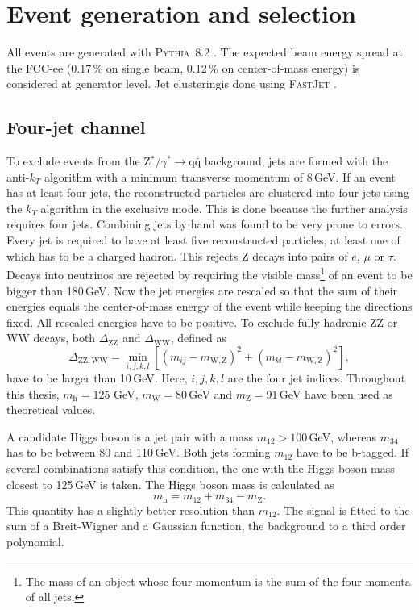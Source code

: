 \section{Event generation and selection}
All events are generated with \textsc{Pythia~8.2} \cite{pythia82}. The expected beam energy spread at the FCC-ee (0.17\,\% on single beam, 0.12\,\% on center-of-mass energy) is considered at generator level. Jet clusteringis done using \textsc{FastJet} \cite{fastjet}.

\subsection{Four-jet channel}
To exclude events from the Z$^*/\gamma^* \rightarrow \mathrm{q\bar{q}}$ background, jets are formed with the anti-$k_T$ algorithm \cite{antikt_algo} with a minimum transverse momentum of 8\,GeV. If an event has at least four jets, the reconstructed particles are clustered into four jets using the $k_T$ algorithm \cite{kt_algo} in the exclusive mode. This is done because the further analysis requires four jets. Combining jets by hand was found  to be very prone to errors.
Every jet is required to have at least five reconstructed particles,  at least one of which has to be a charged hadron. This rejects Z decays into pairs of $e$, $\mu$ or $\tau$. Decays into neutrinos are rejected by requiring the visible mass\footnote{The mass of an object whose four-momentum is the sum of the four momenta of all jets.} of an event to be bigger than 180\,GeV. Now the jet energies are rescaled so that the sum of their energies equals the center-of-mass energy of the event while keeping the directions fixed. 
All rescaled energies have to be positive.
To exclude fully hadronic ZZ or WW decays, both $\Delta_\mathrm{ZZ}$ and $\Delta_\mathrm{WW}$, defined as
\begin{equation}
\Delta_\mathrm{ZZ, WW} = \min_{i, j, k, l} [(m_{ij} - m_\mathrm{W, Z})^2 + (m_{kl} - m_\mathrm{W, Z})^2],
\end{equation}
have to be larger than 10\,GeV. Here, $i, j, k, l$ are the four jet indices. Throughout this thesis, $m_\mathrm{h} = 125\,$\,GeV, $m_\mathrm{W} = 80$\,GeV and  $m_\mathrm{Z} = 91$\,GeV have been used as theoretical values.

A candidate Higgs boson is a jet pair with a mass $m_{12} > 100$\,GeV, whereas $m_{34}$ has to be between 80 and 110\,GeV. Both jets forming $m_{12}$ have to be b-tagged. If several combinations satisfy this condition, the one with the Higgs boson mass closest to 125\,GeV is taken. The Higgs boson mass is calculated as
\begin{equation}
  m_\mathrm{h} = m_{12} + m_{34} - m_\mathrm{Z}.
\label{eq:higgsmass}
\end{equation}
This quantity has a slightly better resolution than $m_{12}$.
The signal is fitted to the sum of a Breit-Wigner and a Gaussian function, the background to a third order polynomial.